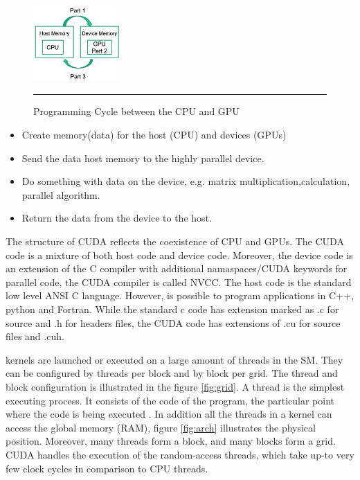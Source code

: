 \begin{figure}[htbp]
	\centering
		\includegraphics[width=0.3\textwidth]{Figures/cycle.png}
		\rule{35em}{0.5pt}
	\caption[Programming Cycle]{Programming Cycle between the CPU and GPU}
	\label{fig:cycle}
\end{figure}

\begin{itemize}
\item Create memory(data) for the host (CPU) and devices (GPUs)
\item Send the data host memory to the highly parallel device.
\item Do something with data on the device, e.g. matrix multiplication,calculation, parallel algorithm.
\item Return the data from the device to the host.
\end{itemize}

The structure of CUDA reflects the coexistence of CPU and GPUs. The CUDA code is a mixture of both host code and device code. Moreover, the device code is an extension of the C compiler with additional namaspaces/CUDA keywords for parallel code, the CUDA compiler is called NVCC. The host code is the standard low level ANSI C language. However, is possible to program applications in C++, python and Fortran. While the standard c code has extension marked as .c for source and .h for headers files, the CUDA code has extensions of .cu for source files and .cuh.

kernels are launched or executed on a large amount of threads in the SM. They can be configured by threads per block and by block per grid. The thread and block configuration is illustrated in the figure \ref{fig:grid}. A thread is the simplest executing process. It consists of the code of the program, the particular point where the code is being executed \cite{hwu}. In addition all the threads in a kernel can access the global memory (RAM), figure  \ref{fig:arch} illustrates the physical position. Moreover, many threads form a block, and many blocks form a grid. CUDA handles the execution of the random-access threads, which take up-to very few clock cycles in comparison to CPU threads.

